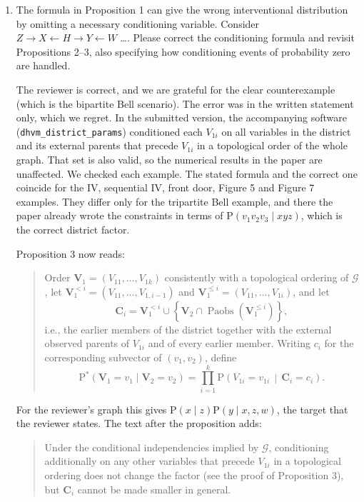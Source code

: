 \documentclass{article}
\def\Pr{{\mathrm{P}}}
\def\Pdo{{\mathrm{P}^*}}
\DeclareMathOperator{\Paobs}{Paobs}
\newcommand{\bV}{\boldsymbol{V}}
\begin{document}
\begin{enumerate}
    \item The formula in Proposition 1 can give the wrong interventional distribution by omitting a necessary conditioning variable. Consider $Z \to X \leftarrow H \to Y \leftarrow W$ \ldots. Please correct the conditioning formula and revisit Propositions 2--3, also specifying how conditioning events of probability zero are handled.
    \begin{mdframed}
        The reviewer is correct, and we are grateful for the clear counterexample (which is the bipartite Bell scenario). The error was in the written statement only, which we regret.
        In the submitted version, the accompanying software (\texttt{dhvm\_district\_params}) conditioned each $V_{1i}$ on all variables in the district and its external parents that precede $V_{1i}$ in a topological order of the whole graph. That set is also valid, so the numerical results in the paper are unaffected. We checked each example. The stated formula and the correct one coincide for the IV, sequential IV, front door, Figure 5 and Figure 7 examples. They differ only for the tripartite Bell example, and there the paper already wrote the constraints in terms of $\Pr(v_1 v_2 v_3 \mid xyz)$, which is the correct district factor.

        Proposition 3 now reads:
        \begin{quote}
        Order $\bV_1=(V_{11},\ldots,V_{1k})$ consistently with a topological ordering of $\mathcal{G}$, let $\bV_1^{<i}=(V_{11},\ldots,V_{1,i-1})$ and $\bV_1^{\leq i} = (V_{11},\ldots,V_{1i})$, and let
        \[
        \boldsymbol{C}_{i} = \bV_1^{<i} \cup \left\{\bV_2 \cap \Paobs(\bV_1^{\leq i})\right\},
        \]
        i.e., the earlier members of the district together with the external observed parents of $V_{1i}$ and of every earlier member. Writing $c_i$ for the corresponding subvector of $(v_1, v_2)$, define
        \[
            \Pdo(\bV_1=v_1\mid \bV_2=v_2)
            =
            \prod_{i=1}^k
            \Pr\!\left(
                V_{1i}=v_{1i}
                \,\middle|\,
                \boldsymbol{C}_{i} = c_i
            \right).
        \]
        \end{quote}
        For the reviewer's graph this gives $\Pr(x \mid z)\Pr(y \mid x, z, w)$, the target that the reviewer states. The text after the proposition adds:
        \begin{quote}
        Under the conditional independencies implied by $\mathcal{G}$, conditioning additionally on any other variables that precede $V_{1i}$ in a topological ordering does not change the factor (see the proof of Proposition 3), but $\boldsymbol{C}_i$ cannot be made smaller in general.
        \end{quote}


\end{mdframed}
\end{enumerate}
\end{document}
